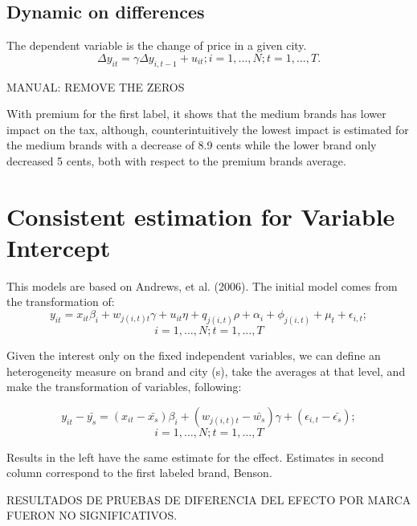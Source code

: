 \documentclass[]{article}
\begin{document}
\subsection{Dynamic on differences}
The dependent variable is the change of price in a given city. 
\begin{equation*}
	\Delta y_{it} = \gamma \Delta y_{i,t-1} + u_{it}; i = 1,\ldots,N; t=1,\ldots,T.
\end{equation*}



MANUAL: REMOVE THE ZEROS 

With premium for the first label, it shows that the medium brands has lower impact on the tax, although, counterintuitively the lowest impact is estimated for the medium brands with a decrease of 8.9 cents while the lower brand only decreased 5 cents, both with respect to the premium brands average. 

 
\section{Consistent estimation for Variable Intercept}
This models are based on Andrews, et al. (2006). The initial model comes from the transformation of:
\begin{equation*}
	y_{it} = x_{it} \beta_{i} + w_{j(i,t)t} \gamma + u_{it} \eta + q_{j(i,t)} \rho + \alpha_{i}  + \phi_{j(i,t)} + \mu_{t} + \epsilon_{i,t}; 
\end{equation*}
$$i = 1,\ldots,N; t=1,\ldots,T$$

Given the interest only on the fixed independent variables, we can define an heterogeneity measure on brand and city (s), take the averages at that level, and make the transformation of variables, following:
 
\begin{equation*}
y_{it} - \bar{y_s} = (x_{it} - \bar{x_{s}}) \beta_{i} + (w_{j(i,t)t}-\bar{w_{s}}) \gamma + (\epsilon_{i,t} - \bar{\epsilon_{s}}); 
\end{equation*}
$$i = 1,\ldots,N; t=1,\ldots,T$$
 
Results in the left have the same estimate for the effect. Estimates in second column correspond to the first labeled brand, Benson.
 


RESULTADOS DE PRUEBAS DE DIFERENCIA DEL EFECTO POR MARCA FUERON NO SIGNIFICATIVOS.
\end{document}
